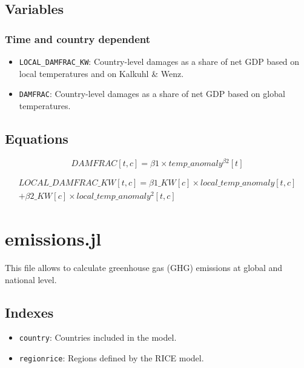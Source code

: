 \documentclass[
]{article}
\providecommand{\tightlist}{%
  \setlength{\itemsep}{0pt}\setlength{\parskip}{0pt}}
\begin{document}
\subsection{Variables}\label{variables-1}

\subsubsection{Time and country
dependent}\label{time-and-country-dependent-3}

\begin{itemize}
\tightlist
\item
  \texttt{LOCAL\_DAMFRAC\_KW}: Country-level damages as a share of net
  GDP based on local temperatures and on Kalkuhl \& Wenz.
\item
  \texttt{DAMFRAC}: Country-level damages as a share of net GDP based on
  global temperatures.
\end{itemize}

\subsection{Equations}\label{equations-1}

\begin{equation}
 DAMFRAC[t,c] = \beta1 \times temp\_anomaly^ {\beta2}[t] 
\end{equation}


\begin{multline}
 LOCAL\_DAMFRAC\_KW[t,c] = \beta1\_KW[c] \times local\_temp\_anomaly[t,c] \\
 + \beta2\_KW[c] \times local\_temp\_anomaly^2[t,c]
\end{multline}


\section{emissions.jl}\label{emissions.jl}

This file allows to calculate greenhouse gas (GHG) emissions at global
and national level.

\subsection{Indexes}\label{indexes-2}

\begin{itemize}
\tightlist
\item
  \texttt{country}: Countries included in the model.
\item
  \texttt{regionrice}: Regions defined by the RICE model.
\end{itemize}
\end{document}
